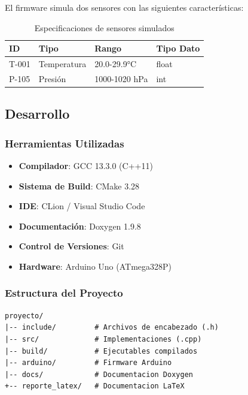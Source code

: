 \documentclass[conference]{IEEEtran}
\begin{document}
El firmware simula dos sensores con las siguientes características:

\begin{table}[h]
\centering
\caption{Especificaciones de sensores simulados}
\label{tab:sensores}
\begin{tabular}{|l|l|l|l|}
\hline
\textbf{ID} & \textbf{Tipo} & \textbf{Rango} & \textbf{Tipo Dato} \\ \hline
T-001 & Temperatura & 20.0-29.9°C & float \\ \hline
P-105 & Presión & 1000-1020 hPa & int \\ \hline
\end{tabular}
\end{table}

\subsection{Desarrollo}

\subsubsection{Herramientas Utilizadas}

\begin{itemize}
    \item \textbf{Compilador}: GCC 13.3.0 (C++11)
    \item \textbf{Sistema de Build}: CMake 3.28
    \item \textbf{IDE}: CLion / Visual Studio Code
    \item \textbf{Documentación}: Doxygen 1.9.8
    \item \textbf{Control de Versiones}: Git
    \item \textbf{Hardware}: Arduino Uno (ATmega328P)
\end{itemize}

\subsubsection{Estructura del Proyecto}

\vspace{0.2cm}
\begin{verbatim}
proyecto/
|-- include/         # Archivos de encabezado (.h)
|-- src/             # Implementaciones (.cpp)
|-- build/           # Ejecutables compilados
|-- arduino/         # Firmware Arduino
|-- docs/            # Documentacion Doxygen
+-- reporte_latex/   # Documentacion LaTeX
\end{verbatim}
\vspace{0.2cm}
\end{document}
